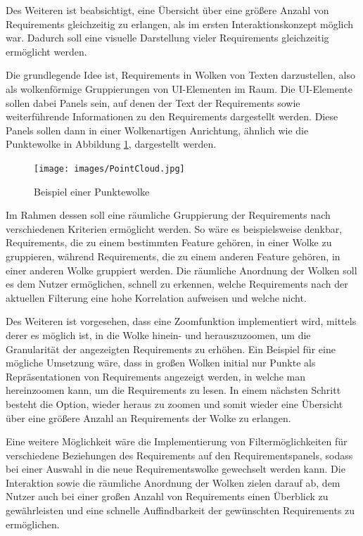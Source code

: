 Des Weiteren ist beabsichtigt, eine Übersicht über eine größere Anzahl von Requirements gleichzeitig zu erlangen, als im ersten Interaktionskonzept möglich war.
Dadurch soll eine visuelle Darstellung vieler Requirements gleichzeitig ermöglicht werden.

Die grundlegende Idee ist, Requirements in Wolken von Texten darzustellen, also als wolkenförmige Gruppierungen von UI-Elementen im Raum.
Die UI-Elemente sollen dabei Panels sein, auf denen der Text der Requirements sowie weiterführende Informationen zu den Requirements dargestellt werden.
Diese Panels sollen dann in einer Wolkenartigen Anrichtung, ähnlich wie die Punktewolke in Abbildung \ref{fig:point-cloud}, dargestellt werden.


\begin{figure}[H]
    \centering
    \texttt{[image: images/PointCloud.jpg]}
    \caption{Beispiel einer Punktewolke}
    \label{fig:point-cloud}
  \end{figure}



Im Rahmen dessen soll eine räumliche Gruppierung der Requirements nach verschiedenen Kriterien ermöglicht werden.
So wäre es beispielsweise denkbar, Requirements, die zu einem bestimmten Feature gehören, in einer Wolke zu gruppieren, während Requirements, die zu einem anderen Feature gehören, in einer anderen Wolke gruppiert werden.
Die räumliche Anordnung der Wolken soll es dem Nutzer ermöglichen, schnell zu erkennen, welche Requirements nach der aktuellen Filterung eine hohe Korrelation aufweisen und welche nicht.

Des Weiteren ist vorgesehen, dass eine Zoomfunktion implementiert wird, mittels derer es möglich ist, in die Wolke hinein- und herauszuzoomen, um die Granularität der angezeigten Requirements zu erhöhen.
Ein Beispiel für eine mögliche Umsetzung wäre, dass in großen Wolken initial nur Punkte als Repräsentationen von Requirements angezeigt werden, in welche man hereinzoomen kann, um die Requirements zu lesen.
In einem nächsten Schritt besteht die Option, wieder heraus zu zoomen und somit wieder eine Übersicht über eine größere Anzahl an Requirements der Wolke zu erlangen.

Eine weitere Möglichkeit wäre die Implementierung von Filtermöglichkeiten für verschiedene Beziehungen des Requirements auf den Requirementspanels, sodass bei einer Auswahl in die neue Requirementswolke gewechselt werden kann.
Die Interaktion sowie die räumliche Anordnung der Wolken zielen darauf ab, dem Nutzer auch bei einer großen Anzahl von Requirements einen Überblick zu gewährleisten und eine schnelle Auffindbarkeit der gewünschten Requirements zu ermöglichen.

